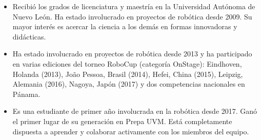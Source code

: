 \documentclass[10pt,a4paper,normalphoto]{altacv}
\begin{document}

\begin{fullwidth}
\makecvheader



\begin{itemize}
\vspace{-0.6cm}
\item Recibió los grados de licenciatura y maestría en la Universidad Autónoma de Nuevo León. Ha estado involucrado en proyectos de robótica desde 2009. Su mayor interés es acercar la ciencia a los demás en formas innovadoras y didácticas.
\end{itemize}

\divider

\begin{itemize}
\vspace{-0.6cm}
\item Ha estado involucrado en proyectos de robótica desde 2013 y ha participado en varias ediciones del torneo RoboCup (categoría OnStage): Eindhoven, Holanda (2013), João Pessoa, Brasil (2014), Hefei, China (2015), Leipzig, Alemania (2016), Nagoya, Japón (2017) y dos competencias nacionales en Pánama.
\end{itemize}

\divider

\begin{itemize}
\vspace{-0.6cm}
\item Es una estudiante de primer año involucrada en la robótica desde 2017. Ganó el primer lugar de su generación en Prepa UVM. Está completamente dispuesta a aprender y colaborar activamente con los miembros del equipo.
\end{itemize}


\end{fullwidth}
\end{document}

